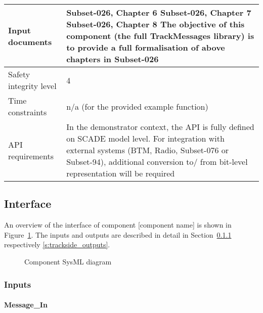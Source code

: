 \begin{longtable}{p{}p{}}
\midrule
Input documents	& 
Subset-026, Chapter 6\newline
Subset-026, Chapter 7\newline
Subset-026, Chapter 8\newline
\newline
The objective of this component (the full TrackMessages library) is to provide a full formalisation of above chapters in Subset-026\\
\midrule
Safety integrity level		& 4 \\
\midrule
Time constraints		& n/a (for the provided example function) \\
\midrule
API requirements 		& In the demonstrator context, the API is fully defined on SCADE model level. For integration with external systems (BTM, Radio, Subset-076 or Subset-94), additional conversion to/ from bit-level representation will be required\\
\bottomrule
\end{longtable}


\subsection{Interface}

An overview of the interface of component [component name] is shown in Figure~\ref{f:trackside_interface}. The inputs and outputs are described in detail in Section~\ref{s:trackside_inputs} respectively \ref{s:trackside_outputs}.

\begin{figure}
\center
{}
\caption{Component SysML diagram}\label{f:trackside_interface}
\end{figure}


\subsubsection{Inputs}\label{s:trackside_inputs}

\paragraph{Message\_In}

